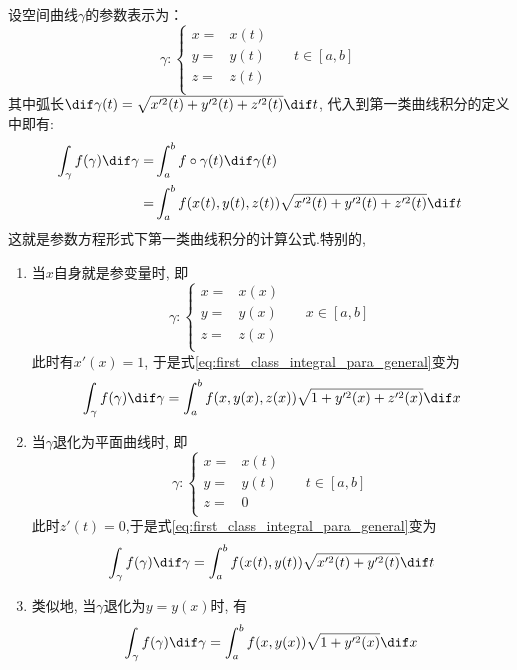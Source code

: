 	设空间曲线$\gamma$的参数表示为：
	\begin{equation*}
		\gamma: \left\{ \begin{aligned}
				x =& x(t) \\
				y =& y(t) \qquad t\in[a,b]\\
				z =& z(t) \\
			\end{aligned} \right.
	\end{equation*}
	其中弧长$\dif\gamma(t) = \sqrt{x'^2(t)+y'^2(t)+z'^2(t)} \dif t$, 代入到第一类曲线积分的定义中即有:
	\begin{equation}
	\label{eq:first_class_integral_para_general}
	\begin{aligned}
			\int_\gamma f(\gamma) \dif \gamma
			=& \int_a^b f \circ \gamma(t) \dif \gamma(t) \\
			=& \int_a^b f(x(t),y(t),z(t)) \sqrt{x'^2(t)+y'^2(t)+z'^2(t)} \dif t
		\end{aligned}
\end{equation}
	这就是参数方程形式下第一类曲线积分的计算公式.特别的,
	\begin{enumerate}
		\item 当$x$自身就是参变量时, 即
			\begin{equation*}
				\gamma: \left\{ \begin{aligned}
						x =& x(x) \\
						y =& y(x) \qquad x\in[a,b]\\
						z =& z(x) \\
					\end{aligned} \right.
			\end{equation*}
			此时有$x'(x)=1$, 于是式\eqref{eq:first_class_integral_para_general}变为
				\begin{equation}
				\label{eq:first_class_integral_para_special_1}
					\int_\gamma f(\gamma) \dif \gamma = \int_a^b f(x,y(x),z(x)) \sqrt{1+y'^2(x)+z'^2(x)} \dif x
				\end{equation}

		\item	当$\gamma$退化为平面曲线时, 即
			\begin{equation*}
				\gamma: \left\{ \begin{aligned}
						x =& x(t) \\
						y =& y(t) \qquad t\in[a,b]\\
						z =& 0 \\
					\end{aligned} \right.
			\end{equation*}
			此时$z'(t)=0$,于是式\eqref{eq:first_class_integral_para_general}变为
			\begin{equation}
				\int_\gamma f(\gamma) \dif \gamma = \int_a^b f(x(t),y(t)) \sqrt{x'^2(t)+y'^2(t)} \dif t
			\end{equation}
		\item 类似地, 当$\gamma$退化为$y=y(x)$时, 有
			\begin{equation}
				\int_\gamma f(\gamma) \dif \gamma = \int_a^b f(x,y(x)) \sqrt{1+y'^2(x)} \dif x
			\end{equation}
	\end{enumerate}

